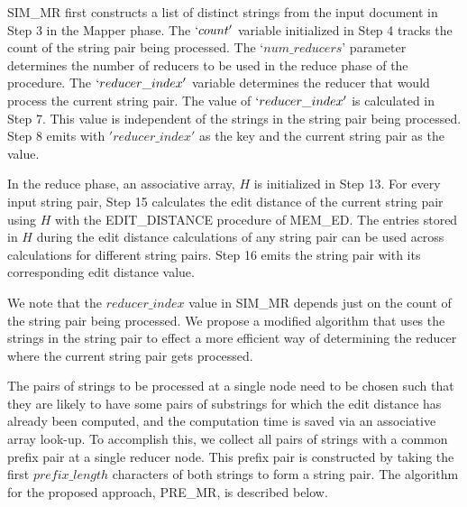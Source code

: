 \documentclass[conference]{IEEEtran}
\begin{document}
SIM\_MR first constructs a list of distinct strings from the input document in Step 3 in the Mapper phase. The $`count'$ variable initialized in Step 4 tracks the count of the string pair being processed. The `$num\_reducers$' parameter determines the number of reducers to be used in the reduce phase of the procedure. The $`reducer\_index'$ variable determines the reducer that would process the current string pair. The value of $`reducer\_index'$ is calculated in Step 7. This value is independent of the strings in the string pair being processed. Step 8 emits with $'reducer\_index'$ as the key and the current string pair as the value.

In the reduce phase, an associative array, $H$ is initialized in Step 13. For every input string pair, Step 15 calculates the edit distance of the current string pair using $H$ with the EDIT\_DISTANCE procedure of MEM\_ED. The entries stored in $H$ during the edit distance calculations of any string pair can be used across calculations for different string pairs. Step 16 emits the string pair with its corresponding edit distance value.

We note that the $reducer\_index$ value in SIM\_MR depends just on the count of the string pair being processed. We propose a modified algorithm that uses the strings in the string pair to effect a more efficient way of determining the reducer where the current string pair gets processed. 

The pairs of strings to be processed at a single node need to be chosen such that they are likely to have some pairs of substrings for which the edit distance has already been computed, and the computation time is saved via an associative array look-up. To accomplish this, we collect all pairs of strings with a common prefix pair at a single reducer node. This prefix pair is constructed by taking the first $prefix\_length$ characters of both strings to form a string pair. The algorithm for the proposed approach, PRE\_MR, is described below. 
\end{document}
